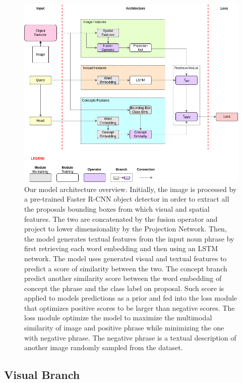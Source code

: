 \begin{figure}
  \centering
  \includegraphics[width=1.0\textwidth]{figures/model-architecture.png}
  \caption[Our model architecture overview]{ Our model architecture
    overview. Initially, the image is processed by a pre-trained
    Faster R-CNN object detector in order to extract all the proposals
    bounding boxes from which visual and spatial features. The two are
    concatenated by the fusion operator and project to lower
    dimensionality by the Projection Network. Then, the model
    generates textual features from the input noun phrase by first
    retrieving each word embedding and then using an LSTM network. The
    model uses generated visual and textual features to predict a
    score of similarity between the two. The concept branch predict
    another similarity score between the word embedding of concept the
    phrase and the class label on proposal. Such score is applied to
    models predictions as a prior and fed into the loss module that
    optimizes positive scores to be larger than negative scores. The
    loss module optimize the model to maximize the multimodal
    similarity of image and positive phrase while minimizing the one
    with negative phrase. The negative phrase is a textual description
    of another image randomly sampled from the dataset.}
  \label{fig:model-architecture}
\end{figure}

\subsection{Visual Branch}
\label{subsec:visual-branch}

